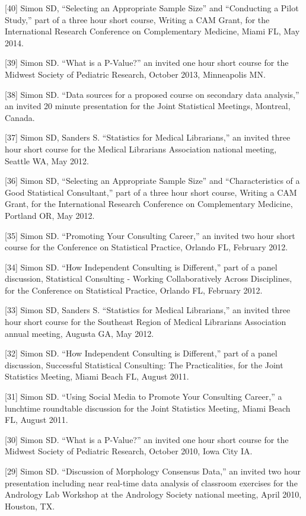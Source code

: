 \documentclass[
  12pt,
]{article}
\begin{document}
{[}40{]} Simon SD, ``Selecting an Appropriate Sample Size'' and
``Conducting a Pilot Study,'' part of a three hour short course, Writing
a CAM Grant, for the International Research Conference on Complementary
Medicine, Miami FL, May 2014.

{[}39{]} Simon SD. ``What is a P-Value?'' an invited one hour short
course for the Midwest Society of Pediatric Research, October 2013,
Minneapolis MN.

{[}38{]} Simon SD. ``Data sources for a proposed course on secondary
data analysis,'' an invited 20 minute presentation for the Joint
Statistical Meetings, Montreal, Canada.

{[}37{]} Simon SD, Sanders S. ``Statistics for Medical Librarians,'' an
invited three hour short course for the Medical Librarians Association
national meeting, Seattle WA, May 2012.

{[}36{]} Simon SD, ``Selecting an Appropriate Sample Size'' and
``Characteristics of a Good Statistical Consultant,'' part of a three
hour short course, Writing a CAM Grant, for the International Research
Conference on Complementary Medicine, Portland OR, May 2012.

{[}35{]} Simon SD. ``Promoting Your Consulting Career,'' an invited two
hour short course for the Conference on Statistical Practice, Orlando
FL, February 2012.

{[}34{]} Simon SD. ``How Independent Consulting is Different,'' part of
a panel discussion, Statistical Consulting - Working Collaboratively
Across Disciplines, for the Conference on Statistical Practice, Orlando
FL, February 2012.

{[}33{]} Simon SD, Sanders S. ``Statistics for Medical Librarians,'' an
invited three hour short course for the Southeast Region of Medical
Librarians Association annual meeting, Augusta GA, May 2012.

{[}32{]} Simon SD. ``How Independent Consulting is Different,'' part of
a panel discussion, Successful Statistical Consulting: The
Practicalities, for the Joint Statistics Meeting, Miami Beach FL, August
2011.

{[}31{]} Simon SD. ``Using Social Media to Promote Your Consulting
Career,'' a lunchtime roundtable discussion for the Joint Statistics
Meeting, Miami Beach FL, August 2011.

{[}30{]} Simon SD. ``What is a P-Value?'' an invited one hour short
course for the Midwest Society of Pediatric Research, October 2010, Iowa
City IA.

{[}29{]} Simon SD. ``Discussion of Morphology Consensus Data,'' an
invited two hour presentation including near real-time data analysis of
classroom exercises for the Andrology Lab Workshop at the Andrology
Society national meeting, April 2010, Houston, TX.
\end{document}
